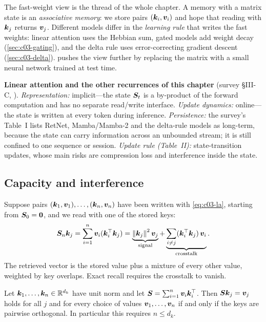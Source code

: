 The fast-weight view is the thread of the whole chapter. A memory with a matrix state is an
\emph{associative memory}: we store pairs $(\bm{k}_i,\bm{v}_i)$ and hope that reading with $\bm{k}_j$
returns $\bm{v}_j$. Different models differ in the \emph{learning rule} that writes the fast
weights: linear attention uses the Hebbian sum, gated models add weight decay
(\cref{sec:c03-gating}), and the delta rule uses error-correcting gradient descent
(\cref{sec:c03-delta}).  pushes the view further by replacing the matrix with a
small neural network trained at test time.

\begin{taxonomy}
\textbf{Linear attention and the other recurrences of this chapter} (survey \S III-C,
\citet{zhoubian2026memory}).
\emph{Representation:} implicit---the state $\bm{S}_t$ is a by-product of the forward computation
and has no separate read/write interface.
\emph{Update dynamics:} online---the state is written at every token during inference.
\emph{Persistence:} the survey's Table~I lists RetNet, Mamba/Mamba-2 and the delta-rule models
as long-term, because the state can carry information across an unbounded stream; it is still
confined to one sequence or session.
\emph{Update rule (Table~II):} state-transition updates, whose main risks are compression loss
and interference inside the state.
\end{taxonomy}

\subsection{Capacity and interference}\label{sec:c03-capacity}

Suppose pairs $(\bm{k}_1,\bm{v}_1),\dots,(\bm{k}_n,\bm{v}_n)$ have been written with \cref{eq:c03-la},
starting from $\bm{S}_0=\bm 0$, and we read with one of the stored keys:
\begin{equation}\label{eq:c03-crosstalk}
  \bm{S}_n\bm{k}_j=\sum_{i=1}^{n}\bm{v}_i(\bm{k}_i^{\top}\bm{k}_j)
  =\underbrace{\left\lVert \bm{k}_j\right\rVert^2\bm{v}_j}_{\text{signal}}
  +\underbrace{\sum_{i\ne j}(\bm{k}_i^{\top}\bm{k}_j)\,\bm{v}_i}_{\text{crosstalk}} .
\end{equation}
The retrieved vector is the stored value plus a mixture of every other value, weighted by key
overlaps. Exact recall requires the crosstalk to vanish.

\begin{proposition}\label{prop:c03-orthogonal}
Let $\bm{k}_1,\dots,\bm{k}_n\in\mathbb{R}^{d_k}$ have unit norm and let $\bm{S}=\sum_{i=1}^n\bm{v}_i\bm{k}_i^{\top}$. Then
$\bm{S}\bm{k}_j=\bm{v}_j$ holds for all $j$ and for every choice of values $\bm{v}_1,\dots,\bm{v}_n$ if and only
if the keys are pairwise orthogonal. In particular this requires $n\le d_k$.
\end{proposition}

